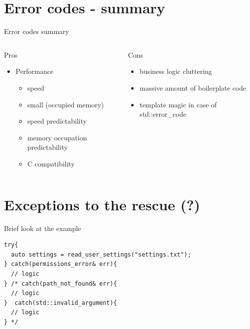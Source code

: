 \documentclass[10pt]{beamer}
\begin{document}
\section{Error codes - summary}

\begin{frame}{Error codes summary}
	\begin{columns}[T]
		\begin{column}{0.48\linewidth}
			Pros 
			\vfill
			\begin{itemize}
				\item Performance
				\begin{itemize}[<+- | alert@+>]
					\item speed
					\item small (occupied memory)
					\item speed predictability
					\item memory occupation predictability
					\item C compatibility
				\end{itemize} \pause
			\end{itemize}
		\end{column}
		\begin{column}{0.48\linewidth}
			Cons
			\vfill
			\begin{itemize}[<+- | alert@+>]
				\item business logic cluttering
				\item massive amount of boilerplate code
				\item template magic in case of std::error\_code
			\end{itemize}
		\end{column}
	\end{columns}
\end{frame}


\section{Exceptions to the rescue (?)}

\begin{frame}[fragile]{Brief look at the example}
	\begin{verbatim}
try{
  auto settings = read_user_settings("settings.txt");
} catch(permissions_error& err){
  // logic
} /* catch(path_not_found& err){
  // logic
}  catch(std::invalid_argument){
  // logic
} */
	\end{verbatim}
\end{frame}
\end{document}
